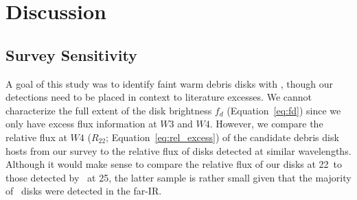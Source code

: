     

\section{Discussion}

    \subsection{Survey Sensitivity}
    
    A goal of this study was to identify faint warm debris disks with \WS, though our detections need to be placed in context to literature excesses. We cannot characterize the full extent of the disk brightness $f_d$ (Equation~\ref{eq:fd}) since we only have excess flux information at $W3$ and $W4$. However, we compare the relative flux at $W4$ ($R_{22}$; Equation~\ref{eq:rel_excess}) of the candidate debris disk hosts from our survey to the relative flux of disks detected at similar wavelengths. Although it would make sense to compare the relative flux of our disks at 22\micron\ to those detected by \iras\ at 25\micron, the latter sample is rather small given that the majority of \iras\ disks were detected in the far-IR. 
    
